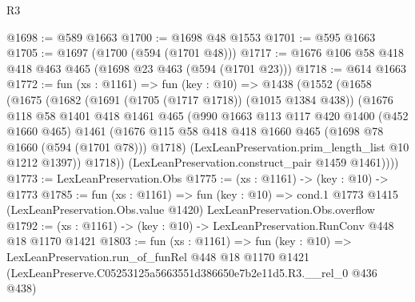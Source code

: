 \begin{lexlean}{R3}
\begin{coremodule}
@1698 := @589 @1663
@1700 := @1698 @48 @1553
@1701 := @595 @1663
@1705 := @1697 (@1700 (@594 (@1701 @48)))
@1717 := @1676 @106 @58 @418 @418 @463 @465 (@1698 @23 @463 (@594 (@1701 @23)))
@1718 := @614 @1663
@1772 := fun (xs : @1161) =>
  fun (key : @10) =>
  @1438
    (@1552
      (@1658
        (@1675
          (@1682
            (@1691 (@1705 (@1717 @1718)) (@1015 @1384 @438))
            (@1676
              @118
              @58
              @1401
              @418
              @1461
              @465
              (@990
                @1663
                @113
                @117
                @420
                @1400
                (@452 @1660 @465)
                @1461
                (@1676 @115 @58 @418 @418 @1660 @465 (@1698 @78 @1660 (@594 (@1701 @78))) @1718)
                (LexLeanPreservation.prim_length_list @10 @1212 @1397))
              @1718))
          (LexLeanPreservation.construct_pair @1459 @1461))))
@1773 := LexLeanPreservation.Obs
@1775 := (xs : @1161) -> (key : @10) -> @1773
@1785 := fun (xs : @1161) =>
  fun (key : @10) =>
  cond.{1} @1773 @1415 (LexLeanPreservation.Obs.value @1420) LexLeanPreservation.Obs.overflow
@1792 := (xs : @1161) -> (key : @10) -> LexLeanPreservation.RunConv @448 @18 @1170 @1421
@1803 := fun (xs : @1161) =>
  fun (key : @10) =>
  LexLeanPreservation.run_of_funRel
    @448
    @18
    @1170
    @1421
    (LexLeanPreserve.C05253125a5663551d386650e7b2e11d5.R3.__rel_0 @436 @438)
\end{coremodule}
\end{lexlean}
